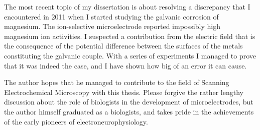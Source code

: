 The most recent topic of my dissertation is about resolving a discrepancy that I encountered in 2011 when I started studying the galvanic corrosion of magnesium.
The ion-selective microelectrode reported impossibly high magnesium ion activities.
I suspected a contribution from the electric field that is the consequence of the potential difference between the surfaces of the metals constituting the galvanic couple.
With a series of experiments I managed to prove that it was indeed the case, and I have shown how big of an error it can cause. 

The author hopes that he managed to contribute to the field of Scanning Electrochemical Microscopy with this thesis.
Please forgive the rather lengthy discussion about the role of biologists in the development of microelectrodes, but the author himself graduated as a biologists, and takes pride in the achievements of the early pioneers of electroneurophysiology.
